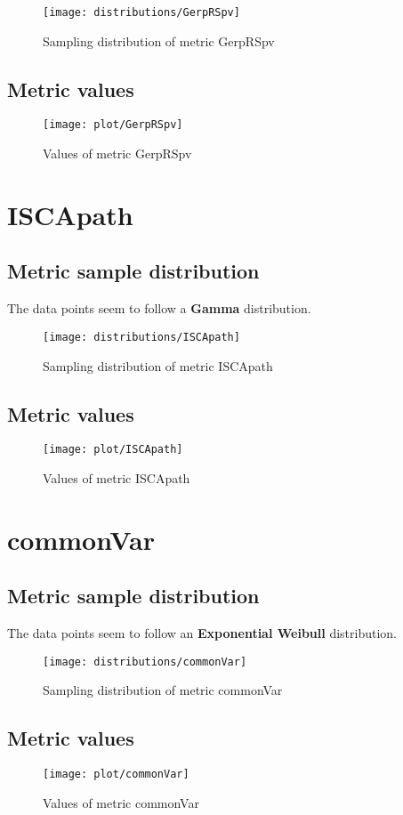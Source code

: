 \documentclass[\main/main.tex]{subfiles}
\begin{document}
\begin{figure}
  \texttt{[image: distributions/GerpRSpv]}
  \caption{Sampling distribution of metric GerpRSpv}
\end{figure}
\subsection{Metric values}
\begin{figure}
  \texttt{[image: plot/GerpRSpv]}
  \caption{Values of metric GerpRSpv}
\end{figure}

\clearpage
\section{ISCApath}
\subsection{Metric sample distribution}
The data points seem to follow a \textbf{Gamma} distribution.

\begin{figure}
  \texttt{[image: distributions/ISCApath]}
  \caption{Sampling distribution of metric ISCApath}
\end{figure}
\subsection{Metric values}
\begin{figure}
  \texttt{[image: plot/ISCApath]}
  \caption{Values of metric ISCApath}
\end{figure}

\clearpage
\section{commonVar}
\subsection{Metric sample distribution}
The data points seem to follow an \textbf{Exponential Weibull} distribution.
\begin{figure}
  \texttt{[image: distributions/commonVar]}
  \caption{Sampling distribution of metric commonVar}
\end{figure}
\subsection{Metric values}
\begin{figure}
  \texttt{[image: plot/commonVar]}
  \caption{Values of metric commonVar}
\end{figure}
\end{document}
